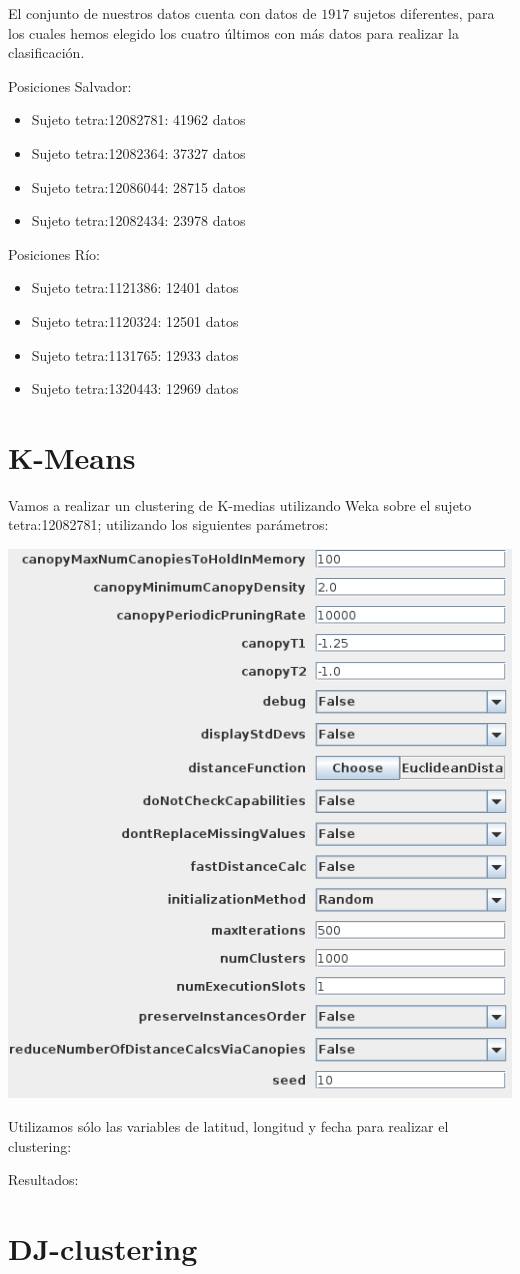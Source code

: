 \documentclass[a4paper,12pt]{article}
\begin{document}
El conjunto de nuestros datos cuenta con datos de $1917$ sujetos diferentes, para los cuales hemos elegido los cuatro \'ultimos con m\'as datos para realizar la clasificaci\'on.

Posiciones Salvador:

\begin{itemize}
\item Sujeto tetra:12082781: 41962 datos
\item Sujeto tetra:12082364: 37327 datos
\item Sujeto tetra:12086044: 28715 datos
\item Sujeto tetra:12082434: 23978 datos
\end{itemize}

Posiciones R\'io:
\begin{itemize}
\item Sujeto tetra:1121386: 12401 datos
\item Sujeto tetra:1120324: 12501 datos
\item Sujeto tetra:1131765: 12933 datos
\item Sujeto tetra:1320443: 12969 datos
\end{itemize}

\section{K-Means}

Vamos a realizar un clustering de K-medias utilizando Weka sobre el sujeto tetra:12082781; utilizando los siguientes par\'ametros:

\bigskip

\includegraphics[scale=0.5]{kMeans_tetra:12082781.png}


Utilizamos s\'olo las variables de latitud, longitud y fecha para realizar el clustering:

Resultados: 

\section{DJ-clustering}
\end{document}
